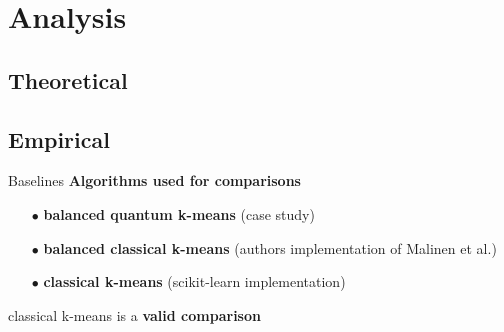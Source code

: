 \section{Analysis}
	\subsection{Theoretical}
	
	\subsection{Empirical}

		\begin{frame}{Baselines}
		\textbf{Algorithms used for comparisons}
		\begin{itemize}
			\item[$\bullet$] \textbf{balanced quantum k-means} (case study)
			\item[$\bullet$] \textbf{balanced classical k-means} (authors implementation of Malinen et al.)
			\item[$\bullet$] \textbf{classical k-means} (scikit-learn implementation)
		\end{itemize}

		classical k-means is a \textbf{valid comparison}

		
		\end{frame}

